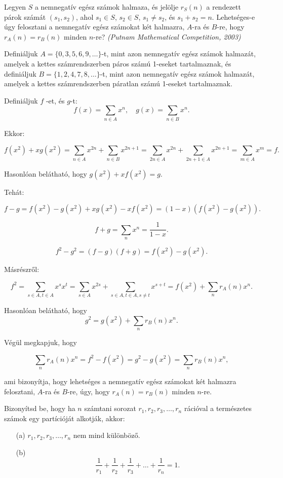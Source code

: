 \begin{extraproblem}
Legyen $S$ a nemnegatív egész számok halmaza, és jelölje $r_{S}(n)$
a rendezett párok számát $(s_{1},s_{2})$, ahol $s_{1}\in S$, $s_{2}\in S$,
$s_{1}\neq s_{2}$, és $s_{1}+s_{2}=n$. Lehetséges-e úgy felosztani
a nemnegatív egész számokat két halmazra, $A$-ra és $B$-re, hogy
$r_{A}(n)=r_{B}(n)$ minden $n$-re? \emph{(Putnam Mathematical Competition,
2003) }
\end{extraproblem}
\begin{solution}
Definiáljuk $A=\{0,3,5,6,9,\dots\}$-t, mint azon nemnegatív egész
számok halmazát, amelyek a kettes számrendszerben páros számú 1-eseket
tartalmaznak, és definiáljuk $B=\{1,2,4,7,8,\dots\}$-t, mint azon
nemnegatív egész számok halmazát, amelyek a kettes számrendszerben
páratlan számú 1-eseket tartalmaznak.

Definiáljuk $f$ -et, és $g$-t: 
\[
f(x)=\sum_{n\in A}x^{n},\quad g(x)=\sum_{n\in B}x^{n}.
\]

Ekkor:

\[
f(x^{2})+xg(x^{2})=\sum_{n\in A}x^{2n}+\sum_{n\in B}x^{2n+1}=\sum_{2n\in A}x^{2n}+\sum_{2n+1\in A}x^{2n+1}=\sum_{m\in A}x^{m}=f.
\]

Hasonlóan belátható, hogy $g(x^{2})+xf(x^{2})=g.$

Tehát:

\[
f-g=f(x^{2})-g(x^{2})+xg(x^{2})-xf(x^{2})=(1-x)(f(x^{2})-g(x^{2})).
\]

\[
f+g=\sum_{n}x^{n}=\frac{1}{1-x}.
\]

\[
f^{2}-g^{2}=(f-g)(f+g)=f(x^{2})-g(x^{2}).
\]

Másrészről:

\[
f^{2}=\sum_{s\in A,t\in A}x^{s}x^{t}=\sum_{s\in A}x^{2s}+\sum_{s\in A,t\in A,s\neq t}x^{s+t}=f(x^{2})+\sum_{n}r_{A}(n)x^{n}.
\]

Hasonlóan belátható, hogy 
\[
g^{2}=g(x^{2})+\sum_{n}r_{B}(n)x^{n}.
\]

Végül megkapjuk, hogy

\[
\sum_{n}r_{A}(n)x^{n}=f^{2}-f(x^{2})=g^{2}-g(x^{2})=\sum_{n}r_{B}(n)x^{n},
\]

ami bizonyítja, hogy lehetséges a nemnegatív egész számokat két halmazra
felosztani, $A$-ra és $B$-re, úgy, hogy $r_{A}(n)=r_{B}(n)$ minden
$n$-re. 
\end{solution}
\begin{extraproblem}
Bizonyítsd be, hogy ha $n$ számtani sorozat $r_{1},r_{2},r_{3},\dots,r_{n}$
rációval a természetes számok egy partícióját alkotják, akkor:
\begin{itemize}
\item[(a)] $r_{1},r_{2},r_{3},\dots,r_{n}$ nem mind különböző. 
\item[(b)] 
\[
\frac{1}{r_{1}}+\frac{1}{r_{2}}+\frac{1}{r_{3}}+\dots+\frac{1}{r_{n}}=1.
\]
\end{itemize}
\end{extraproblem}
